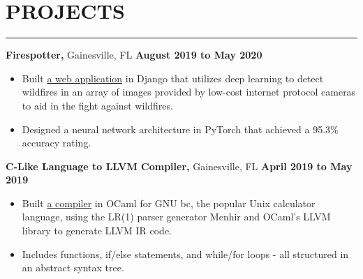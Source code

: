 \section*{PROJECTS}

\hrule \relax
\sectionheaderspace

\noindent\textbf{Firespotter,} Gainesville, FL  \hfill\textbf{August 2019 to May 2020}
\begin{itemize}[noitemsep,nolistsep, label={-}]
	\item Built \href{https://github.com/UF-CEN4914/firespotter}{a web application} in Django that utilizes deep learning to detect wildfires in an array of images provided by low-cost internet protocol cameras to aid in the fight against wildfires.
	\item Designed a neural network architecture in PyTorch that achieved a 95.3\% accuracy rating.
\end{itemize}
\subsectionspace

\noindent\textbf{C-Like Language to LLVM Compiler,} Gainesville, FL  \hfill\textbf{April 2019 to May 2019}
\begin{itemize}[noitemsep,nolistsep, label={-}]
	\item Built \href{https://github.com/hodsonus/programming-language-concepts}{a compiler} in OCaml for GNU bc, the popular Unix calculator language, using the LR(1) parser generator Menhir and OCaml's LLVM library to generate LLVM IR code.
	\item Includes functions, if/else statements, and while/for loops - all structured in an abstract syntax tree.
\end{itemize}
\subsectionspace